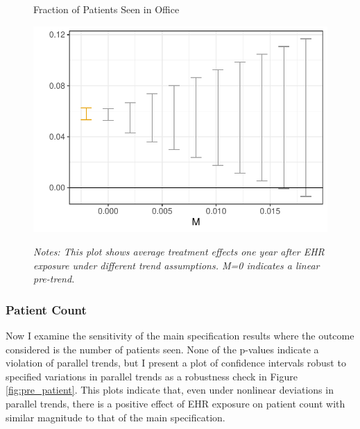 \documentclass[12pt]{article}
\begin{document}
\begin{figure}[ht]
    \centering
    \captionsetup{width=.5\linewidth}
    \caption{Fraction of Patients Seen in Office}
    \includegraphics[scale=.5]{Objects/office_frac_pretrends_plot.pdf}
    \label{fig:pre_frac}
    \vspace{2mm}
    \caption*{\footnotesize{\textit{Notes: This plot shows average treatment effects one year after EHR exposure under different trend assumptions. M=0 indicates a linear pre-trend.}}}
\end{figure}

\subsubsection{Patient Count}

Now I examine the sensitivity of the main specification results where the outcome considered is the number of patients seen. None of the p-values indicate a violation of parallel trends, but I present a plot of confidence intervals robust to specified variations in parallel trends as a robustness check in Figure \ref{fig:pre_patient}. This plots indicate that, even under nonlinear deviations in parallel trends, there is a positive effect of EHR exposure on patient count with similar magnitude to that of the main specification.  
\end{document}
